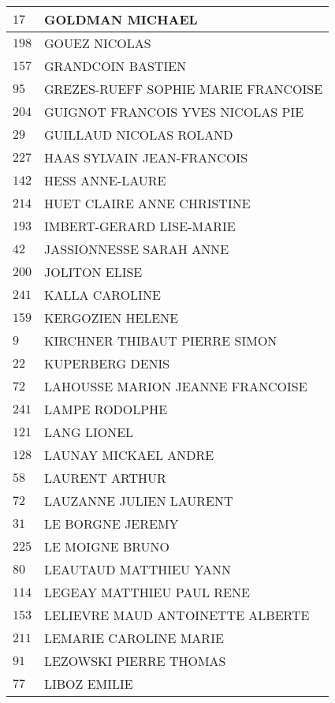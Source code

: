 \begin{xltabular}{\linewidth}{|l|X|}
    \hline
    $17$ & GOLDMAN MICHAEL \\
    \hline
    $198$ & GOUEZ NICOLAS \\
    \hline
    $157$ & GRANDCOIN BASTIEN \\
    \hline
    $95$ & GREZES-RUEFF SOPHIE MARIE FRANCOISE \\
    \hline
    $204$ & GUIGNOT FRANCOIS YVES NICOLAS PIE \\
    \hline
    $29$ & GUILLAUD NICOLAS ROLAND \\
    \hline
    $227$ & HAAS SYLVAIN JEAN-FRANCOIS \\
    \hline
    $142$ & HESS ANNE-LAURE \\
    \hline
    $214$ & HUET CLAIRE ANNE CHRISTINE \\
    \hline
    $193$ & IMBERT-GERARD LISE-MARIE \\
    \hline
    $42$ & JASSIONNESSE SARAH ANNE \\
    \hline
    $200$ & JOLITON ELISE \\
    \hline
    $241$ & KALLA CAROLINE \\
    \hline
    $159$ & KERGOZIEN HELENE \\
    \hline
    $9$ & KIRCHNER THIBAUT PIERRE SIMON \\
    \hline
    $22$ & KUPERBERG DENIS \\
    \hline
    $72$ & LAHOUSSE MARION JEANNE FRANCOISE \\
    \hline
    $241$ & LAMPE RODOLPHE \\
    \hline
    $121$ & LANG LIONEL \\
    \hline
    $128$ & LAUNAY MICKAEL ANDRE \\
    \hline
    $58$ & LAURENT ARTHUR \\
    \hline
    $72$ & LAUZANNE JULIEN LAURENT \\
    \hline
    $31$ & LE BORGNE JEREMY \\
    \hline
    $225$ & LE MOIGNE BRUNO \\
    \hline
    $80$ & LEAUTAUD MATTHIEU YANN \\
    \hline
    $114$ & LEGEAY MATTHIEU PAUL RENE \\
    \hline
    $153$ & LELIEVRE MAUD ANTOINETTE ALBERTE \\
    \hline
    $211$ & LEMARIE CAROLINE MARIE \\
    \hline
    $91$ & LEZOWSKI PIERRE THOMAS \\
    \hline
    $77$ & LIBOZ EMILIE \\

\end{xltabular}
